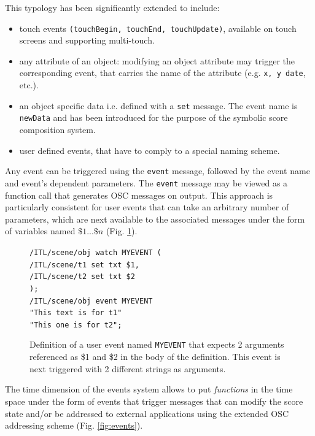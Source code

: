 \documentclass[11pt,a4paper]{article}
\newcommand{\OSC}[1]	{{\fontsize{10pt}{10pt} \selectfont\texttt{#1}}}
\newcommand{\tab}		{\hspace*{4mm}}
\newcommand{\sample}[1]	{\vspace{-0.2em}\begin{center}\colorbox{mygrey}{\begin{minipage}[t]{0.98\columnwidth} {\small \texttt{#1}}\end{minipage}}\end{center}}
\begin{document}
This typology has been significantly extended to include:
\begin{itemize}
\item touch events \OSC{(touchBegin, touchEnd, touchUpdate)}, available on touch screens and supporting multi-touch.
\item any attribute of an object: modifying an object attribute may trigger the corresponding event, that carries the name of the attribute (e.g. \OSC{x, y date}, etc.). 
\item an object specific data i.e. defined with a \OSC{set} message. The event name is \OSC{newData} and has been introduced for the purpose of the symbolic score composition system.
\item user defined events, that have to comply to a special naming scheme.
\end{itemize}
\vspace*{1mm}
Any event can be triggered using the \OSC{event} message, followed by the event name and event's dependent parameters. The \OSC{event} message may be viewed as a function call that generates OSC messages on output. This approach is particularly consistent for user events that can take an arbitrary number of parameters, which are next available to the associated messages under the form of variables named  $\$1...\$n$ (Fig. \ref{fig:uevent}).


\begin{figure}[h]
   \centering
   \sample{/ITL/scene/obj watch MYEVENT ( \\
\tab/ITL/scene/t1 set txt \$1, \\
\tab/ITL/scene/t2 set txt \$2 \\
);   \\   
/ITL/scene/obj event MYEVENT \\
\hspace*{25mm}"This text is for t1"\\
\hspace*{25mm}"This one is for t2"; 
}
   \caption{Definition of a user event named \OSC{MYEVENT} that expects 2 arguments referenced as \$1 and \$2 in the body of the definition. This event is next triggered with 2 different strings as arguments.}
   \label{fig:uevent}
\end{figure}

The time dimension of the events system allows to put \emph{functions} in the time space under the form of events that trigger messages that can modify the score state and/or be addressed to external applications using the extended OSC addressing scheme (Fig. \ref{fig:events}).
  
\end{document}

